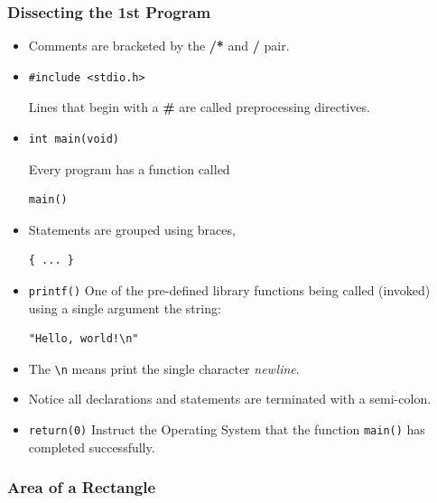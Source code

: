 \begin{frame}[fragile]
\frametitle{Dissecting the 1st Program}

\begin{itemize}[<+->]
\item Comments are bracketed by the {\bf /*} and {\bf */} pair.
\item
\begin{verbatim}
#include <stdio.h>
\end{verbatim}
Lines that begin with a {\bf \#}
are called preprocessing directives.
\item \begin{verbatim}
int main(void)
\end{verbatim}
Every program has a function called \begin{verbatim}
main()
\end{verbatim}

\item Statements are grouped using braces,
\begin{verbatim}
{ ... }
\end{verbatim}

\item \verb+printf()+ One of the pre-defined library functions being called (invoked) using a single argument the string:
\begin{verbatim}
"Hello, world!\n"
\end{verbatim}
\item The \verb+\n+ means print the single character {\it newline}.
\item Notice all declarations and statements are terminated with a
semi-colon.
\item \verb+return(0)+
Instruct the Operating System that the function
\verb+main()+ has completed successfully.
\end{itemize}
\end{frame}



\begin{frame}[fragile]
\frametitle{Area of a Rectangle}

\end{frame}

